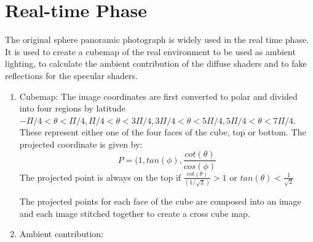 \section{Real-time Phase}
The original sphere panoramic photograph is widely used in the real time phase. It is used to create a cubemap of the real environment to be used as ambient lighting, to calculate the ambient contribution of the diffuse shaders and to fake reflections for the specular shaders.
\begin{enumerate}

\item Cubemap: The image coordinates are first converted to polar and divided into four regions by latitude $-\Pi/4 < \theta < \Pi/4 , \Pi/4 < \theta < 3\Pi/4, 3\Pi/4 < \theta < 5\Pi/4, 5\Pi/4 < \theta < 7\Pi/4$. These represent either one of the four faces of the cube, top or bottom. The projected coordinate is given by:
\begin{equation}
P = (1, tan(\phi), \frac{cot(\theta)}{cos(\phi)}
\end{equation}
 The projected point is always on the top if $ \frac{cot(\theta)} { (1/\sqrt{2}) }> 1$ or $tan(\theta)< \frac{1}{\sqrt{2}}$ \newline
 
 The projected points for each face of the cube are composed into an image and each image stitched together to create a cross cube map.
 
 \item Ambient contribution: 
 
\end{enumerate}